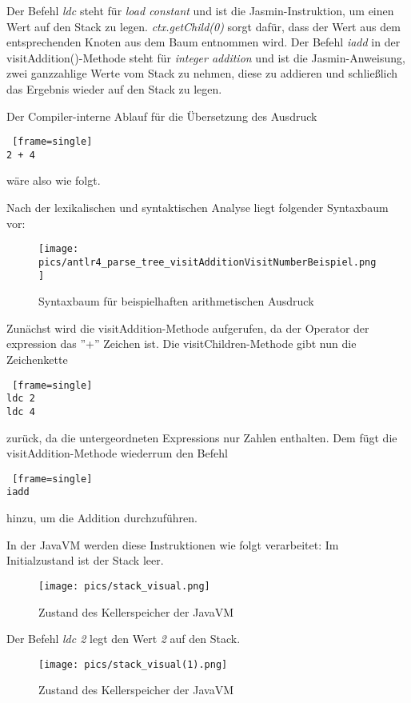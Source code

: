 Der Befehl \textit{ldc} steht für \textit{load constant} und ist die Jasmin-Instruktion, um einen Wert auf den Stack zu legen. \textit{ctx.getChild(0)} sorgt dafür, dass der Wert aus dem entsprechenden Knoten aus dem Baum entnommen wird.
Der Befehl \textit{iadd} in der visitAddition()-Methode steht für \textit{integer addition} und ist die Jasmin-Anweisung, zwei ganzzahlige Werte vom Stack zu nehmen, diese zu addieren und schließlich das Ergebnis wieder auf den Stack zu legen.

\pagebreak

Der Compiler-interne Ablauf für die Übersetzung des Ausdruck 
\begin{lstlisting} [frame=single]
2 + 4
\end{lstlisting}
wäre also wie folgt.

Nach der lexikalischen und syntaktischen Analyse liegt folgender Syntaxbaum vor:

\begin{figure}[h!]
\centering
\texttt{[image: pics/antlr4\_parse\_tree\_visitAdditionVisitNumberBeispiel.png]}
\caption{Syntaxbaum für beispielhaften arithmetischen Ausdruck}
\end{figure}

Zunächst wird die visitAddition-Methode aufgerufen, da der Operator der expression das ''+'' Zeichen ist. Die visitChildren-Methode gibt nun die Zeichenkette
\begin{lstlisting} [frame=single]
ldc 2
ldc 4
\end{lstlisting}
zurück, da die untergeordneten Expressions nur Zahlen enthalten. Dem fügt die visitAddition-Methode wiederrum den Befehl
\begin{lstlisting} [frame=single]
iadd
\end{lstlisting}
hinzu, um die Addition durchzuführen.
\linebreak

In der JavaVM werden diese Instruktionen wie folgt verarbeitet:
Im Initialzustand ist der Stack leer.

\begin{figure}[h!]
\centering
\texttt{[image: pics/stack\_visual.png]}
\caption{Zustand des Kellerspeicher der JavaVM}
\end{figure}

Der Befehl \textit{ldc 2} legt den Wert \textit{2} auf den Stack.

\begin{figure}[h!]
\centering
\texttt{[image: pics/stack\_visual(1).png]}
\caption{Zustand des Kellerspeicher der JavaVM}
\end{figure}

